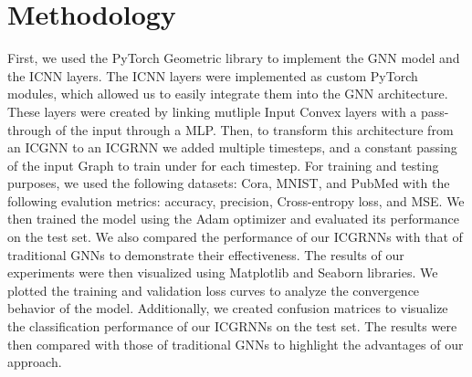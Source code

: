 \documentclass{article} %
\begin{document}
\section{Methodology}
First, we used the PyTorch Geometric library to implement the GNN model and the ICNN layers. The ICNN layers were implemented as custom PyTorch modules, which allowed us to easily integrate them into the GNN architecture. These layers were created by linking mutliple Input Convex layers with a pass-through of the input through a MLP. Then, to transform this architecture from an ICGNN to an ICGRNN we added multiple timesteps, and a constant passing of the input Graph to train under for each timestep. For training and testing purposes, we used the following datasets: Cora, MNIST, and PubMed with the following evalution metrics: accuracy, precision, Cross-entropy loss, and MSE. We then trained the model using the Adam optimizer and evaluated its performance on the test set. We also compared the performance of our ICGRNNs with that of traditional GNNs to demonstrate their effectiveness.
The results of our experiments were then visualized using Matplotlib and Seaborn libraries. We plotted the training and validation loss curves to analyze the convergence behavior of the model. Additionally, we created confusion matrices to visualize the classification performance of our ICGRNNs on the test set. The results were then compared with those of traditional GNNs to highlight the advantages of our approach.
\end{document}
